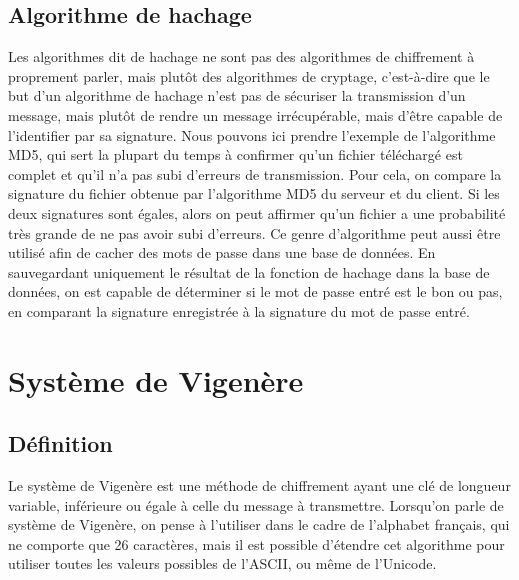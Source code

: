 		\subsection{Algorithme de hachage}
			Les algorithmes dit de hachage ne sont pas des algorithmes de chiffrement à proprement parler, mais plutôt des algorithmes de cryptage, c'est-à-dire que le but d'un algorithme de hachage n'est pas de sécuriser la transmission d'un message, mais plutôt de rendre un message irrécupérable, mais d'être capable de l'identifier par sa signature. Nous pouvons ici prendre l'exemple de l'algorithme MD5, qui sert la plupart du temps à confirmer qu'un fichier téléchargé est complet et qu'il n'a pas subi d'erreurs de transmission. Pour cela, on compare la signature du fichier obtenue par l'algorithme MD5 du serveur et du client. Si les deux signatures sont égales, alors on peut affirmer qu'un fichier a une probabilité très grande de ne pas avoir subi d'erreurs. Ce genre d'algorithme peut aussi être utilisé afin de cacher des mots de passe dans une base de données. En sauvegardant uniquement le résultat de la fonction de hachage dans la base de données, on est capable de déterminer si le mot de passe entré est le bon ou pas, en comparant la signature enregistrée à la signature du mot de passe entré.
	\section{Système de Vigenère}
		\subsection{Définition}
			Le système de Vigenère est une méthode de chiffrement ayant une clé de longueur variable, inférieure ou égale à celle du message à transmettre. Lorsqu'on parle de système de Vigenère, on pense à l'utiliser dans le cadre de l'alphabet français, qui ne comporte que 26 caractères, mais il est possible d'étendre cet algorithme pour utiliser toutes les valeurs possibles de l'ASCII, ou même de l'Unicode.
